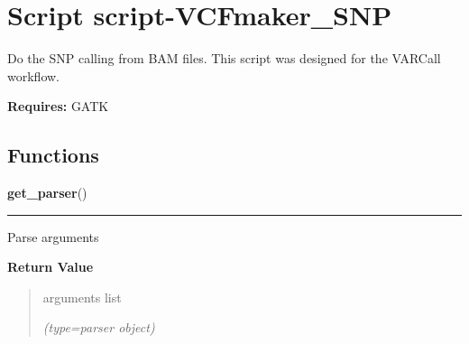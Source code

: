 %
%
%


\section{Script script-VCFmaker\_SNP}

    \label{script-VCFmaker_SNP}
Do the SNP calling from BAM files. This script was designed for the VARCall
workflow.

\textbf{Requires:} GATK





  \subsection{Functions}

    \label{script-VCFmaker_SNP:get_parser}

    \vspace{0.5ex}

\hspace{.8\funcindent}\begin{boxedminipage}{\funcwidth}

    \raggedright \textbf{get\_parser}()

    \vspace{-1.5ex}

    \rule{\textwidth}{0.5\fboxrule}
\setlength{\parskip}{2ex}
    Parse arguments

\setlength{\parskip}{1ex}
      \textbf{Return Value}
    \vspace{-1ex}

      \begin{quote}
      arguments list

      {\it (type=parser object)}

      \end{quote}

    \end{boxedminipage}

